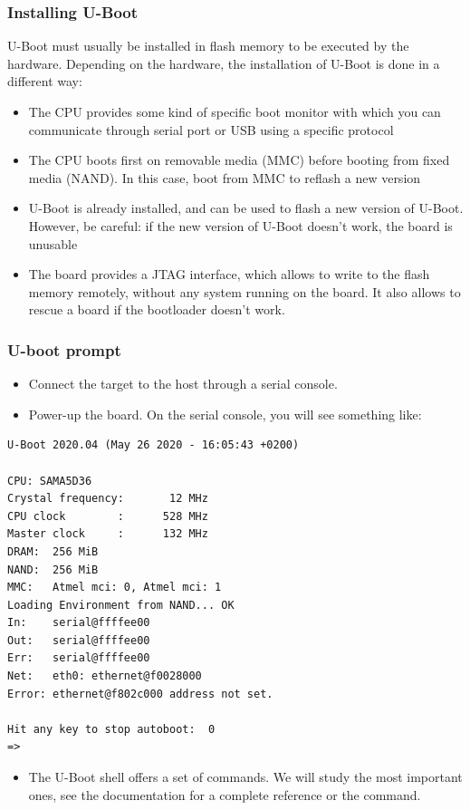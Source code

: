 \begin{frame}
  \frametitle{Installing U-Boot}
  U-Boot must usually be installed in flash memory to be
  executed by the hardware. Depending on the hardware, the
  installation of U-Boot is done in a different way:
  \begin{itemize}
  \item The CPU provides some kind of specific boot monitor with
    which you can communicate through serial port or USB using a
    specific protocol
  \item The CPU boots first on removable media (MMC) before booting
    from fixed media (NAND). In this case, boot from MMC to reflash
    a new version
  \item U-Boot is already installed, and can be used to flash a new
    version of U-Boot. However, be careful: if the new version of
    U-Boot doesn't work, the board is unusable
  \item The board provides a JTAG interface, which allows to write
    to the flash memory remotely, without any system running on the
    board. It also allows to rescue a board if the bootloader
    doesn't work.
  \end{itemize}
\end{frame}

\begin{frame}[fragile]
  \frametitle{U-boot prompt}
  \begin{itemize}
  \item Connect the target to the host through a serial console.
  \item Power-up the board. On the serial console, you will see
        something like:
  \end{itemize}
\tiny
\begin{verbatim}
U-Boot 2020.04 (May 26 2020 - 16:05:43 +0200)

CPU: SAMA5D36
Crystal frequency:       12 MHz
CPU clock        :      528 MHz
Master clock     :      132 MHz
DRAM:  256 MiB
NAND:  256 MiB
MMC:   Atmel mci: 0, Atmel mci: 1
Loading Environment from NAND... OK
In:    serial@ffffee00
Out:   serial@ffffee00
Err:   serial@ffffee00
Net:   eth0: ethernet@f0028000
Error: ethernet@f802c000 address not set.

Hit any key to stop autoboot:  0
=>
\end{verbatim}
\normalsize
  \begin{itemize}
  \item The U-Boot shell offers a set of commands. We will study the
    most important ones, see the documentation for a complete
    reference or the  command.
  \end{itemize}
\end{frame}

